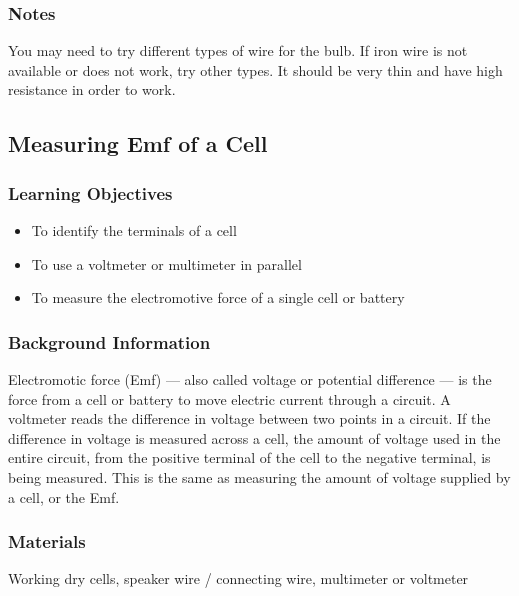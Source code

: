 \subsubsection*{Notes}
You may need to try different types of wire for the bulb.  If iron wire is not available or does not work, try other types.  It should be very thin and have high resistance in order to work.





\subsection{Measuring Emf of a Cell}

\subsubsection*{Learning Objectives}
\begin{itemize}
\item{To identify the terminals of a cell} 
\item{To use a voltmeter or multimeter in parallel} 
\item{To measure the electromotive force of a single cell or battery} 
\end{itemize}

\subsubsection*{Background Information}
Electromotic force (Emf) --- also called voltage or potential difference --- is the force from a cell or battery to move electric current through a circuit. A voltmeter reads the difference in voltage between two points in a circuit. If the difference in voltage is measured across a cell, the amount of voltage used in the entire circuit, from the positive terminal of the cell to the negative terminal, is being measured. This is the same as measuring the amount of voltage supplied by a cell, or the Emf. 

\subsubsection*{Materials}
Working dry cells, speaker wire / connecting wire, multimeter or voltmeter



